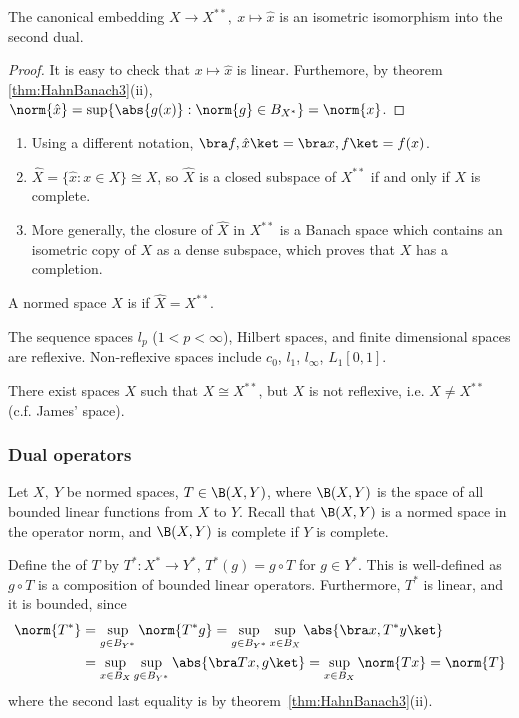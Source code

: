 \documentclass[a4paper]{article}
\begin{document}
\begin{nthm}\label{thm:Bidual}
  The canonical embedding $X\to X^{**},\ x\mapsto\hat{x}$ is an isometric isomorphism into the second dual.
\end{nthm}

\begin{proof}
  It is easy to check that $x\mapsto\hat{x}$ is linear. Furthemore, by theorem \ref{thm:HahnBanach3}(ii), $\norm{\hat{x}}=\sup\{\abs{g(x)}:\norm{g}\in B_{X^*}\}=\norm{x}$.
\end{proof}

\begin{remark}
  \begin{enumerate}[label=(\arabic*)]
    \item Using a different notation, $\bra f,\hat{x}\ket=\bra x,f\ket=f(x)$.
    \item $\hat{X}=\{\hat{x}:x\in X\}\cong X$, so $\hat{X}$ is a closed subspace of $X^{**}$ if and only if $X$ is complete.
    \item More generally, the closure of $\hat{X}$ in $X^{**}$ is a Banach space which contains an isometric copy of $X$ as a dense subspace, which proves that $X$ has a completion.
  \end{enumerate}
\end{remark}

\begin{defi}
A normed space $X$ is  if $\hat{X}=X^{**}$.
\end{defi}
\begin{eg}
The sequence spaces $l_p$ ($1<p<\infty$), Hilbert spaces, and finite dimensional spaces are reflexive. Non-reflexive spaces include $c_0$, $l_1$, $l_\infty$, $L_1[0,1]$.
\end{eg}
\begin{warning}
There exist spaces $X$ such that $X\cong X^{**}$, but $X$ is not reflexive, i.e. $\widehat{X}\not= X^{**}$ (c.f. James' space).
\end{warning}

\subsubsection*{Dual operators}
Let $X,\ Y$ be normed spaces, $T\in\B(X,Y)$, where $\B(X,Y)$ is the space of all bounded linear functions from $X$ to $Y$. Recall that $\B(X,Y)$ is a normed space in the operator norm, and $\B(X,Y)$ is complete if $Y$ is complete.

Define the  of $T$ by $T^*:X^*\to Y^*$, $T^*(g)=g\circ T$ for $g\in Y^*$. This is well-defined as $g\circ T$ is a composition of bounded linear operators. Furthermore, $T^*$ is linear, and it is bounded, since
\begin{align*}
  \norm{T^*}&=\sup_{g\in B_{Y^*}}\norm{T^*g}=\sup_{g\in B_{Y^*}}\sup_{x\in B_X}\abs{\bra x,T^*y\ket}\\
  &=\sup_{x\in B_X}\sup_{g\in B_{Y^*}}\abs{\bra Tx,g\ket}=\sup_{x\in B_X}\norm{Tx}=\norm{T}
\end{align*}
where the second last equality is by theorem~\ref{thm:HahnBanach3}(ii).
\end{document}
